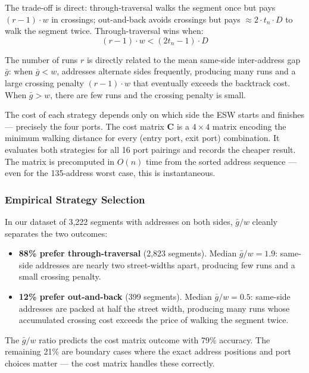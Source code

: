 \documentclass[conference]{IEEEtran}
\begin{document}
The trade-off is direct: through-traversal walks the segment once but pays $(r{-}1) \cdot w$ in crossings; out-and-back avoids crossings but pays $\approx 2 \cdot t_n \cdot D$ to walk the segment twice. Through-traversal wins when:
\begin{equation}
(r{-}1) \cdot w < (2 t_n - 1) \cdot D
\label{eq:strategy}
\end{equation}

The number of runs $r$ is directly related to the mean same-side inter-address gap $\bar{g}$: when $\bar{g} < w$, addresses alternate sides frequently, producing many runs and a large crossing penalty $(r{-}1) \cdot w$ that eventually exceeds the backtrack cost. When $\bar{g} > w$, there are few runs and the crossing penalty is small.

The cost of each strategy depends only on which side the ESW starts and finishes --- precisely the four ports. The cost matrix $\mathbf{C}$ is a $4 \times 4$ matrix encoding the minimum walking distance for every (entry port, exit port) combination. It evaluates both strategies for all 16 port pairings and records the cheaper result. The matrix is precomputed in $O(n)$ time from the sorted address sequence --- even for the 135-address worst case, this is instantaneous.

\subsubsection{Empirical Strategy Selection}
\label{sec:strategy-choice}

In our dataset of 3,222 segments with addresses on both sides, $\bar{g}/w$ cleanly separates the two outcomes:

\begin{itemize}
\item \textbf{88\% prefer through-traversal} (2,823 segments). Median $\bar{g}/w = 1.9$: same-side addresses are nearly two street-widths apart, producing few runs and a small crossing penalty.
\item \textbf{12\% prefer out-and-back} (399 segments). Median $\bar{g}/w = 0.5$: same-side addresses are packed at half the street width, producing many runs whose accumulated crossing cost exceeds the price of walking the segment twice.
\end{itemize}

The $\bar{g}/w$ ratio predicts the cost matrix outcome with 79\% accuracy. The remaining 21\% are boundary cases where the exact address positions and port choices matter --- the cost matrix handles these correctly.
\end{document}
